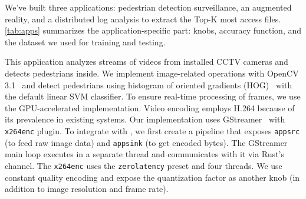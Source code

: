 




We've built three applications: pedestrian detection surveillance, an augmented
reality, and a distributed log analysis to extract the Top-K most access
files. \autoref{tab:apps} summarizes the application-specific part: knobs,
accuracy function, and the dataset we used for training and testing.

 This application analyzes streams of videos from
installed CCTV cameras and detects pedestrians inside. We implement
image-related operations with OpenCV 3.1~\cite{opencvlibrary} and detect
pedestrians using histogram of oriented gradients
(HOG)~\cite{dalal2005histograms} with the default linear SVM classifier. To
ensure real-time processing of frames, we use the GPU-accelerated
implementation. Video encoding employs H.264 because of its prevalence in
existing systems. Our implementation uses GStreamer~\cite{gstreamer} with
\texttt{x264enc} plugin. To integrate with \sysname{}, we first create a
pipeline that exposes \texttt{appsrc} (to feed raw image data) and
\texttt{appsink} (to get encoded bytes). The GStreamer main loop executes in a
separate thread and \sysname{} communicates with it via Rust's channel. The
\texttt{x264enc} uses the \texttt{zerolatency} preset and four threads. We use
constant quality encoding and expose the quantization factor as another knob
(in addition to image resolution and frame rate).

